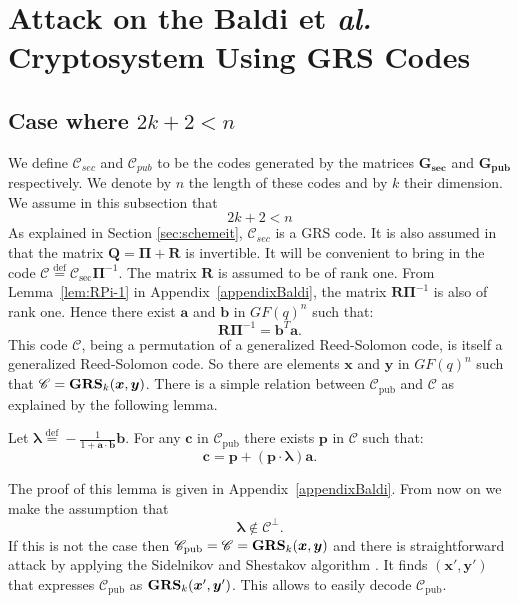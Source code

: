 \documentclass[runningheads,11pt]{llncs}
\newcommand{\eqdef}{\stackrel{\text{def}}{=}}
\newcommand{\code}[1]{\ensuremath{\mathscr{#1}}}
\newcommand{\Csec}{\code{C}_{\text{sec}}}
\newcommand{\Cpub}{\code{C}_{\text{pub}}}
\newcommand{\CC}{\code{C}}
\newcommand{\scp}[2]{#1\cdot #2}
\newcommand{\word}[1]{\ensuremath{\boldsymbol{#1}}}
\newcommand{\av}{\word{a}}
\newcommand{\bv}{\word{b}}
\newcommand{\lambdav}{\word{\lambda}}
\newcommand{\cv}{\word{c}}
\newcommand{\pv}{\word{p}}
\newcommand{\xv}{\word{x}}
\newcommand{\yv}{\word{y}}
\newcommand{\mat}[1]{\ensuremath{\boldsymbol{#1}}}
\newcommand{\Pim}{\mat{\Pi}}
\newcommand{\Qm}{\mat{Q}}
\newcommand{\Rm}{\mat{R}}
\newcommand{\Gms}{\mat{G_{sec}}}
\newcommand{\Gmp}{\mat{G_{pub}}}
\newcommand{\fq}{GF(q)}
\newcommand{\GRS}[3]{\text{\bf GRS}_{#1}(#2,#3)}
\begin{document}
 


\section{Attack on the Baldi et \textit{al.} Cryptosystem Using GRS Codes}\label{sec:attack_Baldi}

\subsection{Case where $2k+2 < n$}
We define $\code{C}_{sec}$ and $\code{C}_{pub}$ to be the codes
generated by the matrices $\Gms$ and $\Gmp$ respectively. 
We denote by $n$ the length of these codes and by $k$ their 
dimension. We  assume in this subsection that
\begin{equation}
\label{eq:small_rate}
2k +2 < n
\end{equation}
As explained in Section \ref{sec:schemeit}, $\code{C}_{sec}$ is a GRS code. 
It is also assumed in \cite{BBCRS11a} that the matrix $\Qm= \Pim +
\Rm$ is invertible. It will be convenient to bring in the code
$\displaystyle \CC \eqdef \Csec \Pim^{-1}$. The matrix
$\Rm$ is assumed to be of rank one. From Lemma~\ref{lem:RPi-1}
in Appendix~\ref{appendixBaldi}, the matrix $\Rm\Pim^{-1}$ is also of rank one. Hence
there exist $\av$ and $\bv$ in $\fq^n$ such that:
\begin{equation}
\label{eq:RPi-1}
\Rm \Pim^{-1} = \bv^T \av.
\end{equation}
This code $\CC$, being a permutation of a generalized Reed-Solomon code, is itself a generalized Reed-Solomon 
code. So there are elements $\xv$ and $\yv$ in $\fq^n$ such that
$\displaystyle \CC = \GRS{k}{\xv}{\yv}$. 
There is a simple relation between $\Cpub$ and $\CC$ as explained
by the following lemma.
\begin{lemma}\label{lem:structure}
Let $\lambdav \eqdef -\frac{1}{1+\scp{\av}{\bv}} \bv$. For any
$\cv$ in $\Cpub$ there exists $\pv$ in $\CC$ such that: 
\begin{equation}
\label{eq:structure}
\cv = \pv + (\scp{\pv}{\lambdav}) \av.
\end{equation}
\end{lemma}
The proof of this lemma is given in Appendix~\ref{appendixBaldi}. From now on we make the assumption that 
\begin{equation}
\label{eq:assumption}
\lambdav \notin \CC^\perp.
\end{equation}
If this is not the case then $\Cpub=\CC=\GRS{k}{\xv}{\yv}$ and there is 
straightforward attack by applying the Sidelnikov and Shestakov algorithm
\cite{SidelShesta92}. It  finds $(\xv',\yv')$ that expresses $\Cpub$ as $\GRS{k}{\xv'}{\yv'}$. This
allows to easily decode $\Cpub$. 
\end{document}
